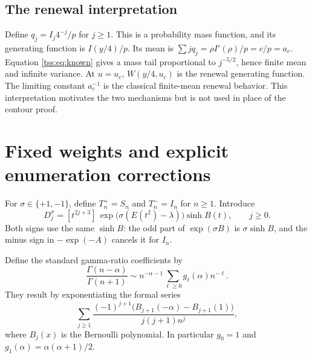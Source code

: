 \documentclass[11pt]{article}
\theoremstyle{remark}\newtheorem{remark}[theorem]{Remark}
\theoremstyle{definition}\newtheorem{definition}[theorem]{Definition}
\begin{document}
\subsection{The renewal interpretation}
Define $q_j=I_j4^{-j}/p$ for $j\geq1$. This is a probability mass function, and its generating function is $I(y/4)/p$. Its mean is
$\sum jq_j=\rho I'(\rho)/p=c/p=a_c$. Equation \eqref{tss:eq:known} gives a mass tail proportional to $j^{-5/2}$, hence finite mean and infinite variance. At $u=u_c$, $W(y/4,u_c)$ is the renewal generating function. The limiting constant $a_c^{-1}$ is the classical finite-mean renewal behavior. This interpretation motivates the two mechanisms but is not used in place of the contour proof.

\section{Fixed weights and explicit enumeration corrections}
\label{tss:sec:fixed}
For $\sigma\in\{+1,-1\}$, define $T_n^+=S_n$ and $T_n^-=I_n$ for $n\geq1$. Introduce
\begin{equation}\label{tss:eq:Dj}
D_j^\sigma=[t^{2j+3}]\,
\exp\bigl(\sigma(E(t^2)-\lambda)\bigr)\sinh B(t),\qquad j\geq0.
\end{equation}
Both signs use the same $\sinh B$: the odd part of $\exp(\sigma B)$ is $\sigma\sinh B$, and the minus sign in $-\exp(-A)$ cancels it for $I_n$.

Define the standard gamma-ratio coefficients by
\begin{equation}\label{tss:eq:gratio}
\frac{\Gamma(n-\alpha)}{\Gamma(n+1)}
\sim n^{-\alpha-1}\sum_{\ell\geq0}g_\ell(\alpha)n^{-\ell}.
\end{equation}
They result by exponentiating the formal series
\begin{equation}\label{tss:eq:bernoulli}
\sum_{j\geq1}\frac{(-1)^{j+1}
 \bigl(B_{j+1}(-\alpha)-B_{j+1}(1)\bigr)}{j(j+1)n^j},
\end{equation}
where $B_j(x)$ is the Bernoulli polynomial. In particular
$g_0=1$ and $g_1(\alpha)=\alpha(\alpha+1)/2$.
\end{document}
